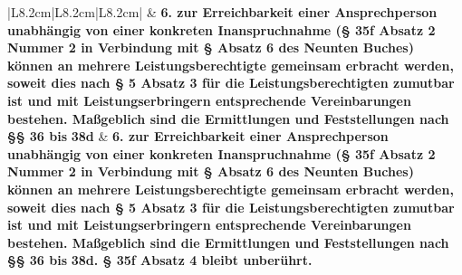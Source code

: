 \documentclass[10pt,a4paper,landscape]{article}
\begin{document}
\begin{longtable}{|L{8.2cm}|L{8.2cm}|L{8.2cm}|}
\hhline{|---|}
 & \textbf{6.   \newline zur Erreichbarkeit einer  \newline Ansprechperson unabhängig von einer  \newline konkreten Inanspruchnahme (\S{} 35f  \newline Absatz 2 Nummer 2 in Verbindung mit \S{}   Absatz 6 des Neunten Buches)  \newline können an mehrere  \newline Leistungsberechtigte gemeinsam  \newline erbracht werden, soweit dies nach \S{} 5  \newline Absatz 3 für die Leistungsberechtigten  \newline zumutbar ist und mit  \newline Leistungserbringern entsprechende  \newline Vereinbarungen bestehen. Maßgeblich  \newline sind die Ermittlungen und  \newline Feststellungen nach \S{}\S{} 36 bis }\textbf{\textcolor{diffred}{38d}} & \textbf{6.   \newline zur Erreichbarkeit einer  \newline Ansprechperson unabhängig von einer  \newline konkreten Inanspruchnahme (\S{} 35f  \newline Absatz 2 Nummer 2 in Verbindung mit \S{}   Absatz 6 des Neunten Buches)   \newline können an mehrere  \newline Leistungsberechtigte gemeinsam  \newline erbracht werden, soweit dies nach \S{} 5  \newline Absatz 3 für die Leistungsberechtigten  \newline zumutbar ist und mit  \newline Leistungserbringern entsprechende  \newline Vereinbarungen bestehen. Maßgeblich  \newline sind die Ermittlungen und  \newline Feststellungen nach \S{}\S{} 36 bis }\textbf{\textcolor{diffgreen}{38d. \S{} 35f  \newline Absatz 4 bleibt unberührt.}} \\
\hhline{|---|}

\end{longtable}
\end{document}
